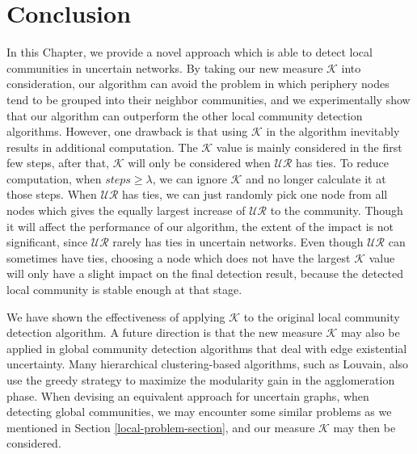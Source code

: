 \documentclass[\main/thesis.tex]{subfiles}
\begin{document}
\section{Conclusion}
In this Chapter, we provide a novel approach which is able to detect local communities in uncertain networks. By taking our new measure $\mathcal{K}$ into consideration, our algorithm can avoid the problem in which periphery nodes tend to be grouped into their neighbor communities, and we experimentally show that our algorithm can outperform the other local community detection algorithms. However, one drawback is that using $\mathcal{K}$ in the algorithm inevitably results in additional computation. The $\mathcal{K}$ value is mainly considered in the first few steps, after that, $\mathcal{K}$ will only be considered when $\mathcal{UR}$ has ties. To reduce computation, when $steps\geqslant\lambda$, we can ignore $\mathcal{K}$ and no longer calculate it at those steps. When $\mathcal{UR}$ has ties, we can just randomly pick one node from all nodes which gives the equally largest increase of $\mathcal{UR}$ to the community. Though it will affect the performance of our algorithm, the extent of the impact is not significant, since $\mathcal{UR}$ rarely has ties in uncertain networks. Even though $\mathcal{UR}$ can sometimes have ties, choosing a node which does not have the largest $\mathcal{K}$ value will only have a slight impact on the final detection result, because the detected local community is stable enough at that stage.

We have shown the effectiveness of applying $\mathcal{K}$ to the original local community detection algorithm. A future direction is that the new measure $\mathcal{K}$ may also be applied in global community detection algorithms that deal with edge existential uncertainty. Many hierarchical clustering-based algorithms, such as Louvain, also use the greedy strategy to maximize the modularity gain in the agglomeration phase. When devising an equivalent approach for uncertain graphs, when detecting global communities, we may encounter some similar problems as we mentioned in Section \ref{local-problem-section}, and our measure $\mathcal{K}$ may then be considered.
\end{document}
